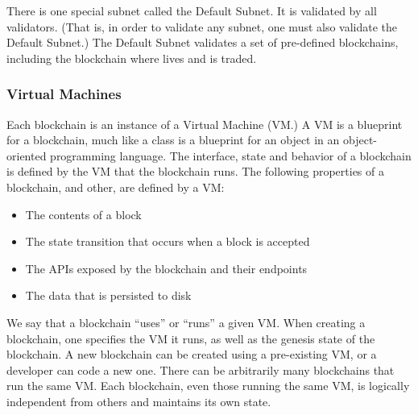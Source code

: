 \documentclass[runningheads]{llncs}
\begin{document}
There is one special subnet called the Default Subnet.
It is validated by all validators. 
(That is, in order to validate any subnet, one must also validate the Default Subnet.)
The Default Subnet validates a set of pre-defined blockchains, including the blockchain where \AVATokenName{} lives and is traded.

\subsubsection{Virtual Machines}

Each blockchain is an instance of a Virtual Machine (VM.)
A VM is a blueprint for a blockchain, much like a class is a blueprint for an object in an object-oriented programming language.
The interface, state and behavior of a blockchain is defined by the VM that the blockchain runs.
The following properties of a blockchain, and other, are defined by a VM: 
\begin{itemize}
\item{} The contents of a block
\item{} The state transition that occurs when a block is accepted
\item{} The APIs exposed by the blockchain and their endpoints
\item{} The data that is persisted to disk
\end{itemize}

We say that a blockchain ``uses'' or ``runs'' a given VM.
When creating a blockchain, one specifies the VM it runs, as well as the genesis state of the blockchain.
A new blockchain can be created using a pre-existing VM, or a developer can code a new one. 
There can be arbitrarily many blockchains that run the same VM.
Each blockchain, even those running the same VM, is logically independent from others and maintains its own state.

\end{document}

